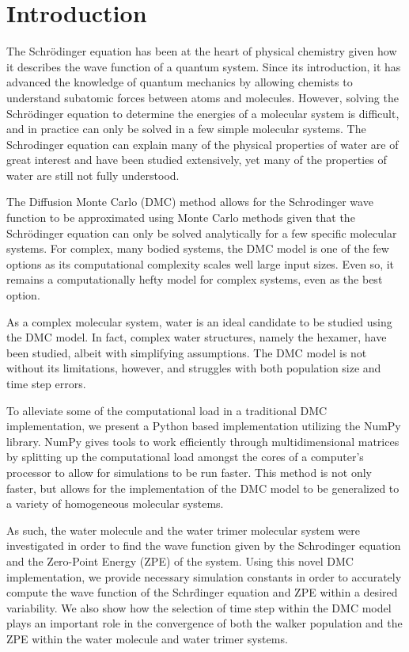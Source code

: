 \documentclass[journal=jacsat,manuscript=article]{achemso}
\begin{document}
\section{Introduction}
The Schr\"odinger equation has been at the heart of physical chemistry given how it describes the wave function of a quantum system. Since its introduction, it has advanced the knowledge of quantum mechanics by allowing chemists to understand subatomic forces between atoms and molecules. However, solving the Schr\"odinger equation to determine the energies of a molecular system is difficult, and in practice can only be solved in a few simple molecular systems. The Schrodinger equation can explain many of the physical properties of water are of great interest and have been studied extensively, yet many of the properties of water are still not fully understood.

The Diffusion Monte Carlo\cite{Anderson1975} (DMC) method allows for the Schrodinger wave function to be approximated using Monte Carlo methods given that the Schr\"odinger equation can only be solved analytically for a few specific molecular systems. For complex, many bodied systems, the DMC model is one of the few options as its computational complexity scales well large input sizes. Even so, it remains a computationally hefty model for complex systems, even as the best option. 
	
As a complex molecular system, water is an ideal candidate to be studied using the DMC model. In fact, complex water structures, namely the hexamer, have been studied, albeit with simplifying assumptions. The DMC model is not without its limitations, however, and struggles with both population size and time step errors. 

To alleviate some of the computational load in a traditional DMC implementation, we present a Python based implementation utilizing the NumPy library. NumPy gives tools to work efficiently through multidimensional matrices by splitting up the computational load amongst the cores of a computer’s processor to allow for simulations to be run faster. This method is not only faster, but allows for the implementation of the DMC model to be generalized to a variety of homogeneous molecular systems. 

As such, the water molecule and the water trimer molecular system were investigated in order to find the wave function given by the Schrodinger equation and the Zero-Point Energy (ZPE) of the system. Using this novel DMC implementation, we provide necessary simulation constants in order to accurately compute the wave function of the Schr\"dinger equation and ZPE within a desired variability. We also show how the selection of time step within the DMC model plays an important role in the convergence of both the walker population and the ZPE within the water molecule and water trimer systems. 
	
\end{document}
